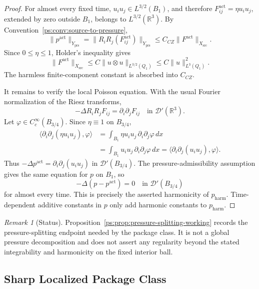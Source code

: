 \documentclass[11pt]{article}
\numberwithin{equation}{section}
\theoremstyle{definition}
\theoremstyle{remark}
\newtheorem{remark}[remark]{Remark}
\newcommand{\R}{\mathbb{R}}
\newcommand{\prs}{\mathrm{prs}}
\newcommand{\harm}{\mathrm{harm}}
\newcommand{\src}{\mathrm{src}}
\newcommand{\act}{\mathrm{act}}
\newcommand{\Xsrc}{X_{\src}}
\newcommand{\Yprs}{Y_{\prs}}
\newcommand{\Qone}{Q_1}
\begin{document}
\begin{proof}
For almost every fixed time, \(u_i u_j\in L^{3/2}(B_1)\), and therefore
\(F^{\act}_{ij}=\eta u_i u_j\), extended by zero outside \(B_1\), belongs to
\(L^{3/2}(\R^3)\).  By Convention~\ref{ps:conv:source-to-pressure},
\[
    \|p^{\act}\|_{\Yprs}
    =
    \|R_iR_j(F^{\act}_{ij})\|_{\Yprs}
    \le
    C_{CZ}\|F^{\act}\|_{\Xsrc}.
\]
Since \(0\le \eta\le1\), Holder's inequality gives
\[
    \|F^{\act}\|_{\Xsrc}
    \le
    C\|u\otimes u\|_{L^{3/2}(\Qone)}
    \le
    C\|u\|_{L^3(\Qone)}^2.
\]
The harmless finite-component constant is absorbed into \(C_{CZ}\).

It remains to verify the local Poisson equation.  With the usual Fourier
normalization of the Riesz transforms,
\[
    -\Delta R_iR_jF_{ij}
    =
    \partial_i\partial_jF_{ij}
    \quad\text{in }\mathcal D'(\R^3).
\]
Let \(\varphi\in C_c^\infty(B_{3/4})\).  Since \(\eta\equiv1\) on
\(B_{3/4}\),
\[
\begin{aligned}
    \langle \partial_i\partial_j(\eta u_i u_j),\varphi\rangle
    &=
    \int_{B_1}\eta u_i u_j\,\partial_i\partial_j\varphi\,dx  \\
    &=
    \int_{B_1}u_i u_j\,\partial_i\partial_j\varphi\,dx
    =
    \langle \partial_i\partial_j(u_i u_j),\varphi\rangle .
\end{aligned}
\]
Thus \(-\Delta p^{\act}=\partial_i\partial_j(u_i u_j)\) in
\(\mathcal D'(B_{3/4})\).  The pressure-admissibility assumption gives the
same equation for \(p\) on \(B_1\), so
\[
    -\Delta(p-p^{\act})=0
    \quad\text{in }\mathcal D'(B_{3/4})
\]
for almost every time.  This is precisely the asserted harmonicity of
\(p_{\harm}\).  Time-dependent additive constants in \(p\) only add harmonic
constants to \(p_{\harm}\).
\end{proof}

\begin{remark}[Status]
Proposition~\ref{ps:prop:pressure-splitting-working} records the pressure-splitting endpoint
needed by the package class.  It is not a global pressure decomposition and
does not assert any regularity beyond the stated integrability and harmonicity
on the fixed interior ball.
\end{remark}

\subsection{Sharp Localized Package Class}
\label{ps:sec:sharp-packages}
\end{document}
